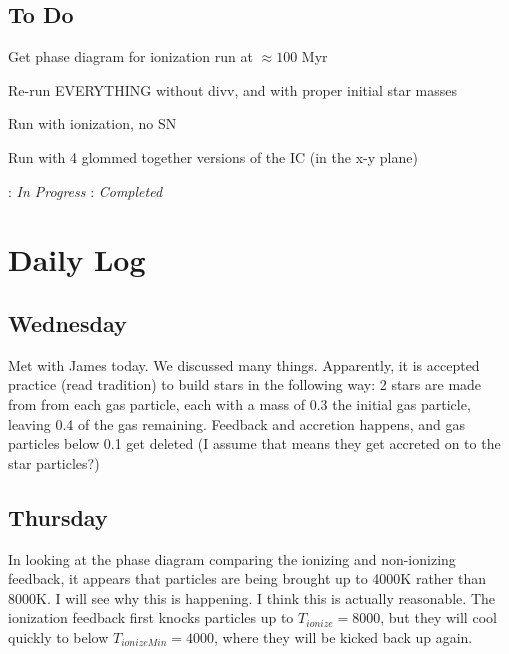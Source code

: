 \documentclass[11pt,letterpaper]{article}
\begin{document}
\subsection*{To Do}
\begin{bullets}
\item \checkmark Get phase diagram for ionization run at $\approx 100$ Myr
\item \checkmark Re-run EVERYTHING without divv, and with proper initial star masses
\item \textleaf Run with ionization, no SN
\item Run with 4 glommed together versions of the IC (in the x-y plane)
\end{bullets}

\textleaf : \textit{In Progress} \qquad \checkmark : \textit{Completed}

\section*{Daily Log}
\subsection*{Wednesday}
Met with James today.  We discussed many things.  Apparently, it is accepted 
practice (read tradition) to build stars in the following way:  2 stars are 
made from from each gas particle, each with a mass of 0.3 the initial gas 
particle, leaving 0.4 of the gas remaining.  Feedback and accretion happens, 
and gas particles below 0.1 get deleted (I assume that means they get accreted
on to the star particles?)

\subsection*{Thursday}
In looking at the phase diagram comparing the ionizing and non-ionizing 
feedback, it appears that particles are being brought up to 4000K rather than 
8000K.  I will see why this is happening.  I think this is actually reasonable.
The ionization feedback first knocks particles up to $T_{ionize}=8000$, but 
they will cool quickly to below $T_{ionizeMin}=4000$, where they will be kicked
back up again.
\end{document}
